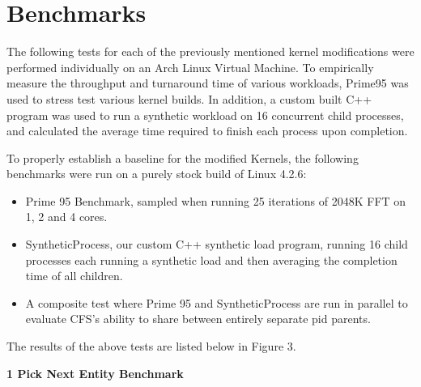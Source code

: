 \section{Benchmarks}

The following tests for each of the previously mentioned kernel modifications were performed individually on an Arch Linux Virtual Machine. To empirically measure the throughput and turnaround time of various workloads, Prime95 was used to stress test various kernel builds. In addition, a custom built C++ program was used to run a synthetic workload on 16 concurrent child processes, and calculated the average time required to finish each process upon completion.

To properly establish a baseline for the modified Kernels, the following benchmarks were run on a purely stock build of Linux 4.2.6:
\begin{itemize}
	\item Prime 95 Benchmark, sampled when running 25 iterations of 2048K FFT on 1, 2 and 4 cores.
	\item SyntheticProcess, our custom C++ synthetic load program, running 16 child processes each running a synthetic load and then averaging the completion time of all children.
	\item A composite test where Prime 95 and SyntheticProcess are run in parallel to evaluate CFS's ability to share between entirely separate pid parents.
\end{itemize}

The results of the above tests are listed below in Figure 3.

\textbf{1 Pick Next Entity Benchmark}